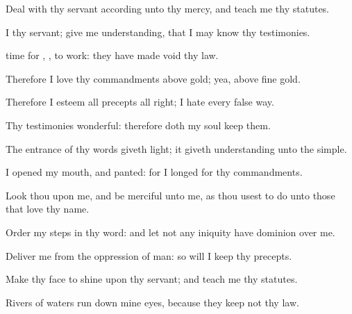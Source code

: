 {\Q {}Deal with thy
servant according unto thy
mercy, and
teach me thy
statutes.


\par }{\Q {}I
{} thy
servant; give me
understanding, that I may
know thy
testimonies.


\par }{\Q {}
time for
{},
{}, to
work:
{} they have made
void thy
law.


\par }{\BB \par }
{\Q {}Therefore I
love thy
commandments above
gold; yea, above fine
gold.


\par }{\Q {}Therefore I esteem all
{}
precepts
{} all
{}
right;
{} I
hate every
false
way.


\par }{
\par }
{\Q {}Thy
testimonies
{}
wonderful: therefore doth my
soul
keep them.


\par }{\Q {}The
entrance of thy
words giveth
light; it giveth
understanding unto the
simple.


\par }{\Q {}I
opened my
mouth, and
panted: for I
longed for thy
commandments.


\par }{\Q {}Look thou upon me, and be
merciful unto me, as thou
usest to do unto those that
love thy
name.


\par }{\Q {}Order my
steps in thy
word: and let not any
iniquity have
dominion over me.


\par }{\Q {}Deliver me from the
oppression of
man: so will I
keep thy
precepts.


\par }{\Q {}Make thy
face to
shine upon thy
servant; and
teach me thy
statutes.


\par }{\Q {}Rivers of
waters run
down mine
eyes, because they
keep not thy
law.


\par }{\BB \par }
